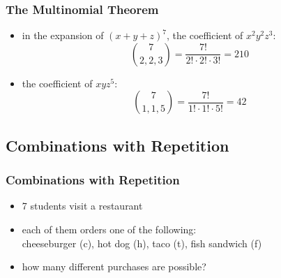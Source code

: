 \documentclass[dvipsnames]{beamer}
\begin{document}
\begin{frame}
  \frametitle{The Multinomial Theorem}

  \begin{example}
    \begin{itemize}
      \item in the expansion of $(x+y+z)^7$, the coefficient of $x^2 y^2 z^3$:
      \begin{equation*}
        {7 \choose 2,2,3} = \frac{7!}{2! \cdot 2! \cdot 3!} = 210
      \end{equation*}
    \end{itemize}
    \begin{itemize}
      \item the coefficient of $x y z^5$:
      \begin{equation*}
        {7 \choose 1,1,5} = \frac{7!}{1! \cdot 1! \cdot 5!} = 42
      \end{equation*}
    \end{itemize}
  \end{example}
\end{frame}

\subsection{Combinations with Repetition}

\begin{frame}
  \frametitle{Combinations with Repetition}

  \begin{example}
    \begin{itemize}
      \item 7 students visit a restaurant
      \item each of them orders one of the following:\\
        cheeseburger (c), hot dog (h), taco (t), fish sandwich (f)
      \item how many different purchases are possible?
    \end{itemize}
  \end{example}
\end{frame}
\end{document}
